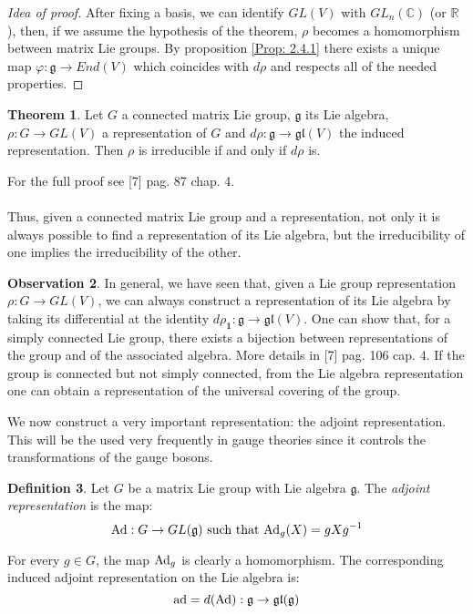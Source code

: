 \documentclass[12pt,a4paper]{report}
\theoremstyle{definition}
\newtheorem{Def}{Definition}[chapter]
\theoremstyle{Theorem}
\newtheorem{Theo}[Def]{Theorem}
\theoremstyle{definition}
\theoremstyle{definition}
\newtheorem{Obs}[Def]{Observation}
\begin{document}
	\begin{proof} [Idea of proof]
		After fixing a basis, we can identify $GL(V)$ with $GL_n(\mathbb{C})$ (or $\mathbb{R}$), then, if we assume the hypothesis of the theorem, $\rho$ becomes a homomorphism between matrix Lie groups. By proposition \ref{Prop: 2.4.1} there exists a unique map $\varphi:\mathfrak{g}\rightarrow End(V)$ which coincides with $d\rho$ and respects all of the needed properties.
	\end{proof}
	\begin{Theo}\label{Theo: 3.1}
		Let $G$ a connected matrix Lie group, $\mathfrak{g}$ its Lie algebra, $\rho:G\rightarrow GL(V)$ a representation of $G$ and $d\rho:\mathfrak{g}\rightarrow \mathfrak{gl}(V)$ the induced representation. Then $\rho$ is irreducible if and only if $d\rho$ is.
	\end{Theo}
	For the full proof see [7] pag. 87 chap. 4.\\
	\\
	Thus, given a connected matrix Lie group and a representation, not only it is always possible to find a representation of its Lie algebra, but the irreducibility of one implies the irreducibility of the other.
	\begin{Obs}
		In general, we have seen that, given a Lie group representation $\rho:G\rightarrow GL(V)$, we can always construct a representation of its Lie algebra by taking its differential at the identity $d\rho_\textbf{1}:\mathfrak{g}\rightarrow \mathfrak{gl}(V)$. One can show that, for a simply connected Lie group, there exists a bijection between representations of the group and of the associated algebra. More details in [7] pag. 106 cap. 4. If the group is connected but not simply connected, from the Lie algebra representation one can obtain a representation of the universal covering of the group.
	\end{Obs}
	We now construct a very important representation: the adjoint representation. This will be the used very frequently in gauge theories since it controls the transformations of the gauge bosons.
	\begin{Def}
		Let $G$ be a matrix Lie group with Lie algebra $\mathfrak{g}$. The \textit{adjoint representation} is the map:
		$$\hbox{Ad}:G\rightarrow GL(\mathfrak{g})\hbox{ such that } \hbox{Ad}_g(X)=gXg^{-1}$$
	\end{Def}
	For every $g\in G$, the map $\hbox{Ad}_g$ is clearly a homomorphism. The corresponding induced adjoint representation on the Lie algebra is:
	$$\hbox{ad}=d(\hbox{Ad}):\mathfrak{g}\rightarrow\mathfrak{gl(g)}$$
\end{document}
